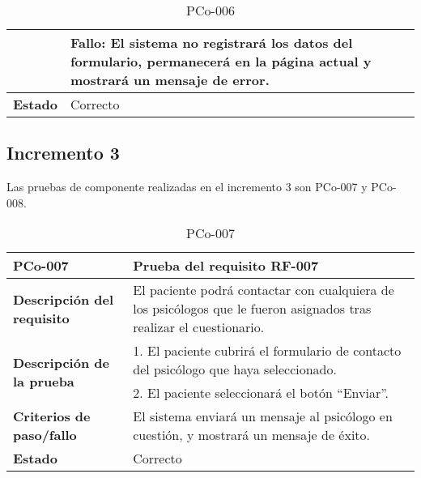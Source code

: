 \begin{table}[htpb]
\begin{tabularx}{\textwidth}{|l|X|}
                                                   & Fallo: El sistema no registrará los datos del formulario, permanecerá en la página actual y mostrará un mensaje de error.\\ \hline
\textbf{Estado}                                    & Correcto                                                                                                                                                                                                                                                                                                                                 \\ \hline
\end{tabularx}
\caption{PCo-006}
\end{table}


\subsection{Incremento 3}

Las pruebas de componente realizadas en el incremento 3 son PCo-007 y PCo-008.

\begin{table}[htpb]
\centering
\begin{tabularx}{\textwidth}{|l|X|}
\hline
\rowcolor[gray]{0.9}\textbf{PCo-007}                                     & \textbf{Prueba del requisito RF-007}                                                                                \\ \hline
\textbf{Descripción del requisito}                 & El paciente podrá contactar con cualquiera de los psicólogos que le fueron asignados tras realizar el cuestionario. \\ \hline
\multirow{2}{*}{\textbf{Descripción de la prueba}} & 1. El paciente cubrirá el formulario de contacto del psicólogo que haya seleccionado.                               \\ \cline{2-2} 
                                                   & 2. El paciente seleccionará el botón ``Enviar''.
\\ \hline
\textbf{Criterios de paso/fallo}                   & El sistema enviará un mensaje al psicólogo en cuestión, y mostrará un mensaje de éxito.                             \\ \hline
\textbf{Estado}                                    & Correcto                                                                                                            \\ \hline
\end{tabularx}
\caption{PCo-007}
\end{table}


